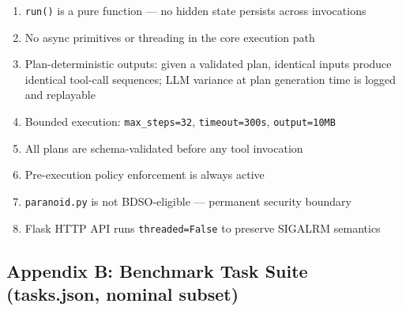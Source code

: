 \documentclass[
]{article}
\providecommand{\tightlist}{%
  \setlength{\itemsep}{0pt}\setlength{\parskip}{0pt}}
\begin{document}
\begin{enumerate}
\def\labelenumi{\arabic{enumi}.}
\tightlist
\item
  \texttt{run()} is a pure function --- no hidden state persists across
  invocations
\item
  No async primitives or threading in the core execution path
\item
  Plan-deterministic outputs: given a validated plan, identical inputs
  produce identical tool-call sequences; LLM variance at plan generation
  time is logged and replayable
\item
  Bounded execution: \texttt{max\_steps=32}, \texttt{timeout=300s},
  \texttt{output=10MB}
\item
  All plans are schema-validated before any tool invocation
\item
  Pre-execution policy enforcement is always active
\item
  \texttt{paranoid.py} is not BDSO-eligible --- permanent security
  boundary
\item
  Flask HTTP API runs \texttt{threaded=False} to preserve SIGALRM
  semantics
\end{enumerate}

\subsection{Appendix B: Benchmark Task Suite (tasks.json, nominal
subset)}\label{appendix-b-benchmark-task-suite-tasksjson-nominal-subset}
\end{document}
